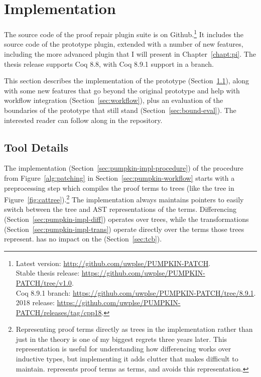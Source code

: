 \section{Implementation}
\label{sec:pumpkin-impl}


The source code of the  proof repair plugin suite is on Github.\footnote{Latest version: \url{http://github.com/uwplse/PUMPKIN-PATCH}.\\ Stable thesis release: \url{https://github.com/uwplse/PUMPKIN-PATCH/tree/v1.0}.\\ Coq 8.9.1 branch: \url{https://github.com/uwplse/PUMPKIN-PATCH/tree/8.9.1}.\\ 2018 release: \url{https://github.com/uwplse/PUMPKIN-PATCH/releases/tag/cpp18}.}
It includes the source code of the  prototype plugin, extended with a number of new features,
including the more advanced \toolnamec plugin that I will present in Chapter~\ref{chapt:pi}.
The thesis release supports Coq 8.8, with Coq 8.9.1 support in a branch.

This section describes the implementation of the \sysname prototype (Section~\ref{sec:tool}),
along with some new features that go beyond the original prototype and help with workflow integration (Section~\ref{sec:workflow}),
plus an evaluation of the boundaries of the \sysname prototype that still stand (Section~\ref{sec:bound-eval}).
The interested reader can follow along in the repository.


\subsection{Tool Details}
\label{sec:tool}


The implementation (Section~\ref{sec:pumpkin-impl-procedure}) of the procedure from Figure~\ref{alg:patching} in Section~\ref{sec:pumpkin-workflow}
starts with a preprocessing step which compiles the proof terms to 
trees (like the tree in Figure~\ref{fig:cattree}).\footnote{Representing proof terms directly as trees in the implementation rather
than just in the theory is one of my biggest regrets three years later.
This representation is useful for understanding how differencing works over inductive types, but implementing it adds clutter that makes \sysname difficult to maintain.
\toolnamec represents proof terms as terms, and avoids this representation.}
The implementation always maintains pointers to easily switch between the tree and AST representations of the terms.
Differencing (Section~\ref{sec:pumpkin-impl-diff}) operates over trees, 
while the transformations (Section~\ref{sec:pumpkin-impl-trans}) operate directly over the terms those trees represent.
\sysname has no impact on the  (Section~\ref{sec:tcb}).

